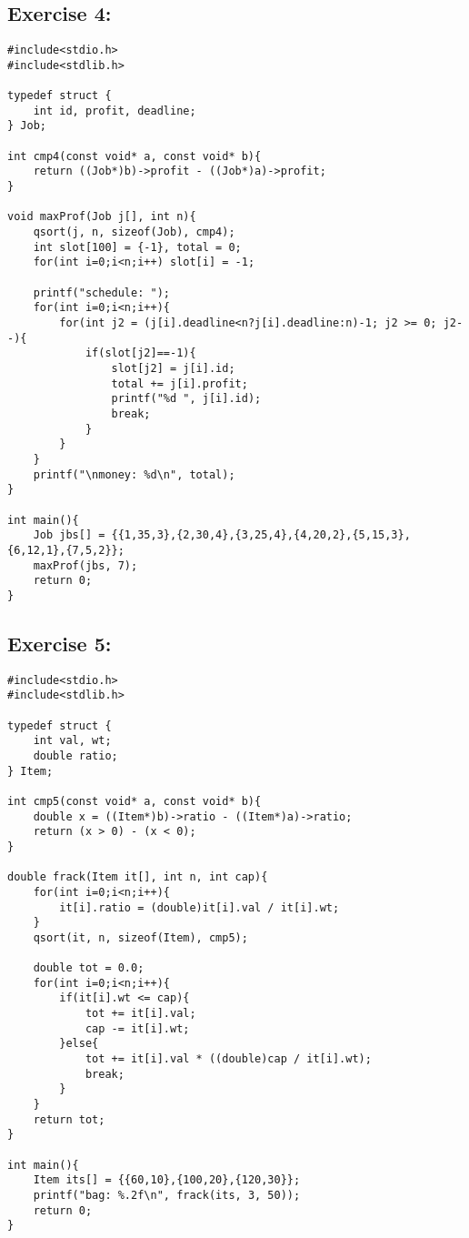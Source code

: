 \documentclass{article}
\begin{document}
\subsection*{Exercise 4:}
\begin{verbatim}
#include<stdio.h>
#include<stdlib.h>

typedef struct {
    int id, profit, deadline;
} Job;

int cmp4(const void* a, const void* b){
    return ((Job*)b)->profit - ((Job*)a)->profit;
}

void maxProf(Job j[], int n){
    qsort(j, n, sizeof(Job), cmp4);
    int slot[100] = {-1}, total = 0;
    for(int i=0;i<n;i++) slot[i] = -1;

    printf("schedule: ");
    for(int i=0;i<n;i++){
        for(int j2 = (j[i].deadline<n?j[i].deadline:n)-1; j2 >= 0; j2--){
            if(slot[j2]==-1){
                slot[j2] = j[i].id;
                total += j[i].profit;
                printf("%d ", j[i].id);
                break;
            }
        }
    }
    printf("\nmoney: %d\n", total);
}

int main(){
    Job jbs[] = {{1,35,3},{2,30,4},{3,25,4},{4,20,2},{5,15,3},{6,12,1},{7,5,2}};
    maxProf(jbs, 7);
    return 0;
}
\end{verbatim}
\subsection*{Exercise 5:}
\begin{verbatim}
#include<stdio.h>
#include<stdlib.h>

typedef struct {
    int val, wt;
    double ratio;
} Item;

int cmp5(const void* a, const void* b){
    double x = ((Item*)b)->ratio - ((Item*)a)->ratio;
    return (x > 0) - (x < 0);
}

double frack(Item it[], int n, int cap){
    for(int i=0;i<n;i++){
        it[i].ratio = (double)it[i].val / it[i].wt;
    }
    qsort(it, n, sizeof(Item), cmp5);

    double tot = 0.0;
    for(int i=0;i<n;i++){
        if(it[i].wt <= cap){
            tot += it[i].val;
            cap -= it[i].wt;
        }else{
            tot += it[i].val * ((double)cap / it[i].wt);
            break;
        }
    }
    return tot;
}

int main(){
    Item its[] = {{60,10},{100,20},{120,30}};
    printf("bag: %.2f\n", frack(its, 3, 50));
    return 0;
}

\end{verbatim}
\end{document}
